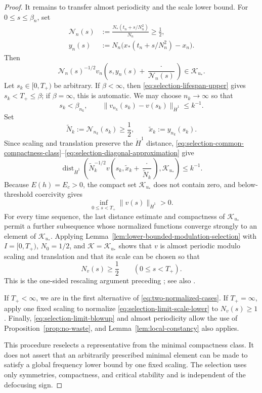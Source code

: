 \documentclass{interact}
\numberwithin{equation}{section}
\theoremstyle{plain}
\theoremstyle{definition}
\theoremstyle{remark}
\begin{document}
\begin{proof}
It remains to transfer almost periodicity and the scale lower bound. For $0\le s\le\beta_n$, set
\begin{align*}
 \mathcal N_n(s)
 &:=\frac{N_*(t_n+s/N_n^2)}{N_n}\ge\frac12,\\
 y_n(s)
 &:=N_n\bigl(x_*(t_n+s/N_n^2)-x_n\bigr).
\end{align*}
Then
\begin{equation}\label{eq:selection-common-compactness-class}
 \mathcal N_n(s)^{-1/2}
 v_n\left(s,y_n(s)+\frac{\cdot}{\mathcal N_n(s)}\right)
 \in\mathcal K_{u_*}.
\end{equation}
Let $s_k\in[0,T_+)$ be arbitrary. If $\beta<\infty$, then \eqref{eq:selection-lifespan-upper} gives $s_k<T_+\le\beta$; if $\beta=\infty$, this is automatic. We may choose $n_k\to\infty$ so that
\begin{equation}\label{eq:selection-diagonal-approximation}
 s_k<\beta_{n_k},
 \qquad
 \|v_{n_k}(s_k)-v(s_k)\|_{\dot H^1}\le k^{-1}.
\end{equation}
Set
\[
 \widetilde N_k:=\mathcal N_{n_k}(s_k)\ge\frac12,
 \qquad
 \widetilde x_k:=y_{n_k}(s_k).
\]
Since scaling and translation preserve the $\dot H^1$ distance, \eqref{eq:selection-common-compactness-class}--\eqref{eq:selection-diagonal-approximation} give
\[
 \operatorname{dist}_{\dot H^1}\!\left(
 \widetilde N_k^{-1/2}v\left(s_k,\widetilde x_k+\frac{\cdot}{\widetilde N_k}\right),
 \mathcal K_{u_*}\right)\le k^{-1}.
\]
Because $E(h)=E_c>0$, the compact set $\mathcal K_{u_*}$ does not contain zero, and below-threshold coercivity gives
\[
 \inf_{0\le s<T_+}\|v(s)\|_{\dot H^1}>0.
\]
For every time sequence, the last distance estimate and compactness of $\mathcal K_{u_*}$ permit a further subsequence whose normalized functions converge strongly to an element of $\mathcal K_{u_*}$. Applying Lemma~\ref{lem:lower-bounded-modulation-selection} with $I=[0,T_+)$, $N_0=1/2$, and $\mathcal K=\mathcal K_{u_*}$ shows that $v$ is almost periodic modulo scaling and translation and that its scale can be chosen so that
\begin{equation}\label{eq:selection-limit-scale-lower}
 N_v(s)\ge\frac12
 \qquad(0\le s<T_+).
\end{equation}
This is the one-sided rescaling argument preceding \cite[Theorem~1.8]{KillipVisan2012}; see also \cite[Section~5.3]{KillipVisan2013}.

If $T_+<\infty$, we are in the first alternative of \eqref{eq:two-normalized-cases}. If $T_+=\infty$, apply one fixed scaling to normalize \eqref{eq:selection-limit-scale-lower} to $N_v(s)\ge1$. Finally, \eqref{eq:selection-limit-blowup} and almost periodicity allow the use of Proposition~\ref{prop:no-waste}, and Lemma~\ref{lem:local-constancy} also applies.

This procedure reselects a representative from the minimal compactness class. It does not assert that an arbitrarily prescribed minimal element can be made to satisfy a global frequency lower bound by one fixed scaling. The selection uses only symmetries, compactness, and critical stability and is independent of the defocusing sign.
\end{proof}
\end{document}
